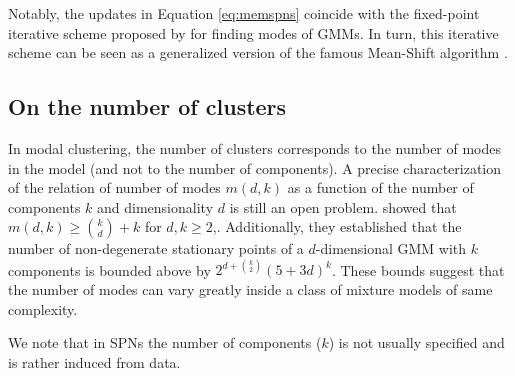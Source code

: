 \documentclass[accepted]{tpm2023} %
\newcommand{\TODO}[1]{\textbf{\color{red}{TODO: #1}}}
\begin{document}
Notably, the updates in Equation \ref{eq:memspns} coincide with the fixed-point iterative scheme proposed by \citet{Carreira-Perpinan2000} for finding modes of GMMs.
In turn, this iterative scheme can be seen as a generalized version of the famous Mean-Shift algorithm \cite{Chacon2019}.


\subsection{On the number of clusters}

In modal clustering, the number of clusters corresponds to the number of modes in the model (and not to the number of components).
A precise characterization of the relation of number of modes $m(d, k)$ as a function of the number of components $k$ and dimensionality $d$ is still an open problem.
\citet{Amendola2019} showed that $m(d, k) \geq {k \choose d} + k$ for $d, k \geq 2$,.
Additionally, they established that the number of non-degenerate stationary points of a $d$-dimensional GMM with $k$ components is bounded above by $2^{d+{k \choose 2}}(5+3d)^k$.
These bounds suggest that the number of modes can vary greatly inside a class of mixture models of same complexity.

We note that in SPNs the number of components ($k$) is not usually specified and is rather induced from data.




\end{document}
